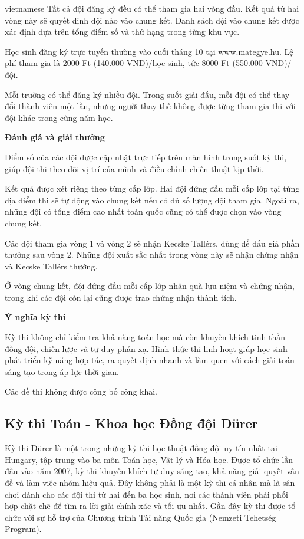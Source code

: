 \documentclass{article}
\begin{document}
\begin{otherlanguage*}{vietnamese}
Tất cả đội đăng ký đều có thể tham gia hai vòng đầu. Kết quả từ hai vòng này sẽ quyết định đội nào vào chung kết.
Danh sách đội vào chung kết được xác định dựa trên tổng điểm số và thứ hạng trong từng khu vực.

Học sinh đăng ký trực tuyến thường vào cuối tháng 10 tại www.mategye.hu. Lệ phí tham gia là 2000 Ft (140.000 VND)/học sinh, tức 8000 Ft (550.000 VND)/đội.

Mỗi trường có thể đăng ký nhiều đội. Trong suốt giải đấu, mỗi đội có thể thay đổi thành viên một lần,
nhưng người thay thế không được từng tham gia thi với đội khác trong cùng năm học.

\textbf{Đánh giá và giải thưởng}

Điểm số của các đội được cập nhật trực tiếp trên màn hình trong suốt kỳ thi, giúp đội thi theo dõi vị trí của mình và điều chỉnh chiến thuật kịp thời.

Kết quả được xét riêng theo từng cấp lớp. Hai đội đứng đầu mỗi cấp lớp tại từng địa điểm thi sẽ tự động vào chung kết nếu có đủ số lượng đội tham gia.
Ngoài ra, những đội có tổng điểm cao nhất toàn quốc cũng có thể được chọn vào vòng chung kết.

Các đội tham gia vòng 1 và vòng 2 sẽ nhận Kecske Tallérs, dùng để đấu giá phần thưởng sau vòng 2.
Những đội xuất sắc nhất trong vòng này sẽ nhận chứng nhận và Kecske Tallérs thưởng.

Ở vòng chung kết, đội đứng đầu mỗi cấp lớp nhận quà lưu niệm và chứng nhận, trong khi các đội còn lại cũng được trao chứng nhận thành tích.

\textbf{Ý nghĩa kỳ thi}

Kỳ thi không chỉ kiểm tra khả năng toán học mà còn khuyến khích tinh thần đồng đội, chiến lược và tư duy phản xạ.
Hình thức thi linh hoạt giúp học sinh phát triển kỹ năng hợp tác, ra quyết định nhanh và làm quen với cách giải toán sáng tạo trong áp lực thời gian.

\begin{remark*}
    Các đề thi không được công bố công khai.
\end{remark*}

\newpage

\subsection{Kỳ thi Toán - Khoa học Đồng đội Dürer}

Kỳ thi Dürer là một trong những kỳ thi học thuật đồng đội uy tín nhất tại Hungary, tập trung vào ba môn Toán học, Vật lý và Hóa học.
Được tổ chức lần đầu vào năm 2007, kỳ thi khuyến khích tư duy sáng tạo, khả năng giải quyết vấn đề và làm việc nhóm hiệu quả.
Đây không phải là một kỳ thi cá nhân mà là sân chơi dành cho các đội thi từ hai đến ba học sinh,
nơi các thành viên phải phối hợp chặt chẽ để tìm ra lời giải chính xác và tối ưu nhất.
Gần đây kỳ thi được tổ chức với sự hỗ trợ của Chương trình Tài năng Quốc gia (Nemzeti Tehetség Program).


\end{otherlanguage*}
\end{document}
